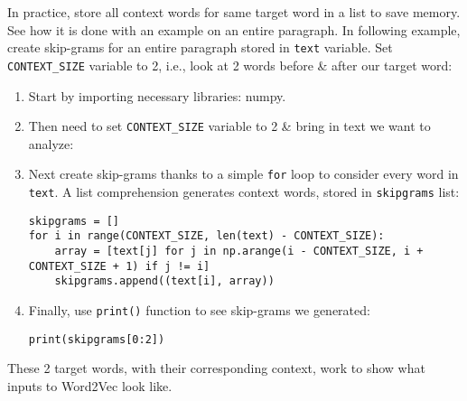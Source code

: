 \documentclass{article}
\begin{document}
\begin{itemize}
\begin{itemize}
\begin{itemize}
            In practice, store all context words for same target word in a list to save memory. See how it is done with an example on an entire paragraph. In following example, create skip-grams for an entire paragraph stored in {\tt text} variable. Set \verb|CONTEXT_SIZE| variable to 2, i.e., look at 2 words before \& after our target word:
            \begin{enumerate}
                \item Start by importing necessary libraries: numpy.
                \item Then need to set \verb|CONTEXT_SIZE| variable to 2 \& bring in text we want to analyze:
                \item Next create skip-grams thanks to a simple {\tt for} loop to consider every word in {\tt text}. A list comprehension generates context words, stored in {\tt skipgrams} list:
                \begin{verbatim}
skipgrams = []
for i in range(CONTEXT_SIZE, len(text) - CONTEXT_SIZE):
    array = [text[j] for j in np.arange(i - CONTEXT_SIZE, i + CONTEXT_SIZE + 1) if j != i]
    skipgrams.append((text[i], array))
                \end{verbatim}
                \item Finally, use {\tt print()} function to see skip-grams we generated:
                \begin{verbatim}
print(skipgrams[0:2])
                \end{verbatim}
            \end{enumerate}
            These 2 target words, with their corresponding context, work to show what inputs to Word2Vec look like.


\end{itemize}
\end{itemize}
\end{itemize}
\end{document}
